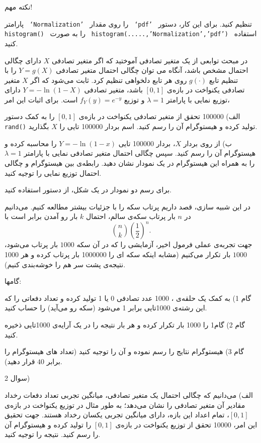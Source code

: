 نکته مهم!

پارامتر 
\texttt{
`Normalization'
}
را روی مقدار 
\texttt{
`pdf'
}
تنظیم کنید. برای این کار، دستور 
\texttt{
histogram()
}
را به صورت 
\texttt{
histogram(.....,'Normalization','pdf')
}
استفاده کنید.


\Q
در مبحث توابعی از یک متغیر تصادفی آموختید که اگر متغیر تصادفی $X$ دارای چگالی احتمال  مشخص باشد، آنگاه می توان چگالی احتمال  متغیر تصادفی $Y=g(X)$ را با تنظیم تابع $g(\cdot)$ روی هر تابع دلخواهی تنظیم کرد. ثابت می‌شود که اگر $X$ متغیر تصادفی یکنواخت در بازه‌ی $[0,1]$ باشد، متغیر تصادفی 
$
Y=-\ln (1-X)
$
دارای توزیع نمایی با پارامتر $\lambda=1$ و توزیع 
$
f_Y(y)=e^{-y}
$
است. برای اثبات این امر،

الف) 100000 تحقق از متغیر تصادفی یکنواخت در بازه‌ی $[0,1]$ را به کمک دستور 
\texttt{rand()}
تولید کرده و هیستوگرام آن را رسم کنید. اسم بردار 100000 تایی را $X$ بگذارید.

ب) از روی بردار $X$، بردار 100000 تایی $Y=-\ln(1-x)$ را محاسبه کرده و هیستوگرام آن را رسم کنید. سپس چگالی احتمال متغیر تصادفی نمایی با پارامتر $\lambda=1$ را به همراه این هیستوگرام در یک نمودار نشان دهید. رابطه‌ی بین هیستوگرام و چگالی احتمال  توزیع نمایی را توجیه کنید.

برای رسم دو نمودار در یک شکل، از دستور 
\texttt{}
استفاده کنید.

\Q
در این شبیه سازی، قصد داریم پرتاب سکه را با جزئیات بیشتر مطالعه کنیم. می‌دانیم در 
$
n
$
بار پرتاب سکه‌ی سالم، احتمال 
$
k
$
بار رو آمدن برابر است با
$$
\binom{n}{k}(\frac{1}{2})^n.
$$
جهت تجربه‌ی عملی فرمول اخیر، آزمایشی را که در آن سکه
$
1000
$
بار پرتاب می‌شود،
$
1000
$
بار تکرار می‌کنیم (مشابه اینکه سکه ای را 1000000 بار پرتاب کرده و هر 1000 نتیجه‌ی پشت سر هم را خوشه‌بندی کنیم).

گامها:

گام 1) به کمک یک حلقه‌ی ،
1000 عدد تصادفی 0 یا 1 تولید کرده و تعداد دفعاتی را که این رشته‌ی 1000تایی برابر 1 می‌شود (سکه رو می‌آید) را حساب کنید.

گام 2) گام1 را 1000 بار تکرار کرده و هر بار نتیجه را در یک آرایه‌ی 1000تایی ذخیره کنید.

گام 3) هیستوگرام نتایج را رسم نموده و آن را توجیه کنید (تعداد های هیستوگرام را برابر $40$ قرار دهید).

سوال 2)

الف) می‌دانیم که چگالی احتمال یک متغیر تصادفی، میانگین تجربی تعداد دفعات رخداد مقادیر آن متغیر تصادفی را نشان می‌دهد؛ به طور مثال در توزیع یکنواخت در بازه‌ی $[0,1]$، تمام اعداد این بازه، دارای میانگین تجربی یکسان رخداد هستند. جهت تحقیق این امر، 10000 تحقق از توزیع یکنواخت در بازه‌ی $[0,1]$ را تولید کرده و هیستوگرام آن را رسم کنید. نتیجه را توجیه کنید.

